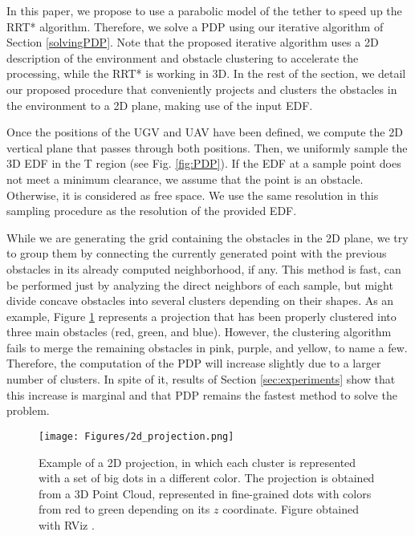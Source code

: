 In this paper, we propose to use a parabolic model of the tether to speed up the RRT* algorithm. Therefore, we solve a PDP using our iterative algorithm of Section \ref{solvingPDP}. Note that the proposed iterative algorithm uses a 2D description of the environment and obstacle clustering to accelerate the processing, while the RRT* is working in 3D. In the rest of the section, we detail our proposed procedure that conveniently projects and clusters the obstacles in the environment to a 2D plane, making use of the input EDF.

Once the positions of the UGV and UAV have been defined, we compute the 2D vertical plane that passes through both positions. Then, we uniformly sample the 3D EDF in the T region 
(see Fig. \ref{fig:PDP}). If the EDF at a sample point does not meet a minimum clearance, we assume that the point is an obstacle. Otherwise, it is considered as free space. We use the same resolution in this sampling procedure as the resolution of the provided EDF.

While we are generating the grid containing the obstacles in the 2D plane, we try to group them by connecting the  currently generated point with the previous obstacles in its already computed neighborhood, if any. This method is fast, can be performed just by analyzing the direct neighbors of each sample, but might divide concave obstacles into several clusters depending on their shapes. As an example, Figure \ref{fig:clustering} represents a projection that has been properly clustered into three main obstacles (red, green, and blue). However, the clustering algorithm fails to merge the remaining obstacles in pink, purple, and yellow, to name a few. Therefore, the computation of the PDP will increase slightly due to a larger number of clusters. In spite of it, results of Section \ref{sec:experiments} show that this increase is marginal and that PDP remains the fastest method to solve the problem. 








\begin{figure}[!t]
  \texttt{[image: Figures/2d\_projection.png]}
  \caption{Example of a 2D projection, in which each cluster is represented with a set of big dots in a different color. The projection is obtained from a 3D Point Cloud, represented in fine-grained dots with colors from red to green depending on its $z$ coordinate. Figure obtained with RViz \cite{rviz}. }
  \label{fig:clustering}
\end{figure}
